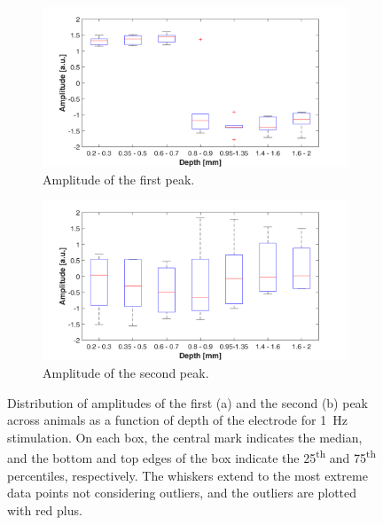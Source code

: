\documentclass{pracalicmgr}
\begin{document}
 
    \begin{figure}[H]
    	\begin{subfigure}{.5\textwidth}
    		\centering
    		\includegraphics[width=1.\linewidth]{profile_1Hz_amp.png}
    		\caption{Amplitude of the first peak.}
    		\label{rys:profil_1Hz_amp1}
    	\end{subfigure}%
    	\begin{subfigure}{.5\textwidth}
    		\centering
    		\includegraphics[width=1.\linewidth]{profile_1Hz_amp2.png}
    		\caption{Amplitude of the second peak.}
    		\label{rys:profil_1Hz_amp2}
    	\end{subfigure}
    	
    	\caption{Distribution of amplitudes of the first (a) and the second (b) peak across animals as a function of depth of the electrode for 1~Hz stimulation. On each box, the central mark indicates the median, and the bottom and top edges of the box indicate the 25\textsuperscript{th} and 75\textsuperscript{th} percentiles, respectively. The whiskers extend to the most extreme data points not considering outliers, and the outliers are plotted with red plus.}
    	\label{rys:profil_1Hz_amp}
    \end{figure}
\end{document}

